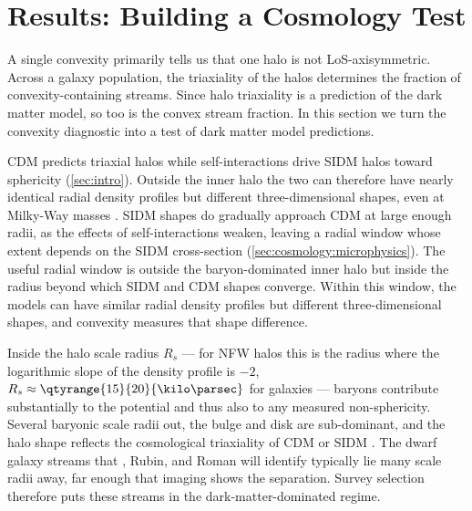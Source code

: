 \documentclass[linenumbers,twocolumn]{aastex701}
\begin{document}



\section{Results: Building a Cosmology Test}\label{sec:cosmology}

    A single convexity primarily tells us that one halo is not \gls{LoS}-axisymmetric. %
    Across a galaxy population, the triaxiality of the halos determines the fraction of convexity-containing streams. %
    Since halo triaxiality is a prediction of the dark matter model, so too is the convex stream fraction. %
    In this section we turn the convexity diagnostic into a test of dark matter model predictions. %
    
    \gls{CDM} predicts triaxial halos while self-interactions drive \gls{SIDM} halos toward sphericity (\autoref{sec:intro}). %
    Outside the inner halo the two can therefore have nearly identical radial density profiles but different three-dimensional shapes, even at Milky-Way masses \citep{Bautista+:2025:JeansModelShapes,Adhikari+:2025:AstrophysicalTestsDark}. %
    \gls{SIDM} shapes do gradually approach \gls{CDM} at large enough radii, as the effects of self-interactions weaken, leaving a radial window whose extent depends on the \gls{SIDM} cross-section (\autoref{sec:cosmology:microphysics}). %
    The useful radial window is outside the baryon-dominated inner halo but inside the radius beyond which \gls{SIDM} and \gls{CDM} shapes converge. %
    Within this window, the models can have similar radial density profiles but different three-dimensional shapes, and convexity measures that shape difference. %

    Inside the halo scale radius $R_s$ --- for \gls{NFW} halos this is the radius where the logarithmic slope of the density profile is $-2$, $R_s\approx\qtyrange{15}{20}{\kilo\parsec}$ for galaxies --- baryons contribute substantially to the potential and thus also to any measured non-sphericity. %
    Several baryonic scale radii out, the bulge and disk are sub-dominant, and the halo shape reflects the cosmological triaxiality of \gls{CDM} or \gls{SIDM} \citep{Vera-Ciro+:2011:ShapeDarkMatter,Baptista+:2022:OrientationsDMHalos}. %
    The dwarf galaxy streams that \euclid, \gls{Rubin}, and \gls{Roman} will identify typically lie many scale radii away, far enough that imaging shows the separation. %
    Survey selection therefore puts these streams in the dark-matter-dominated regime. %
\end{document}
